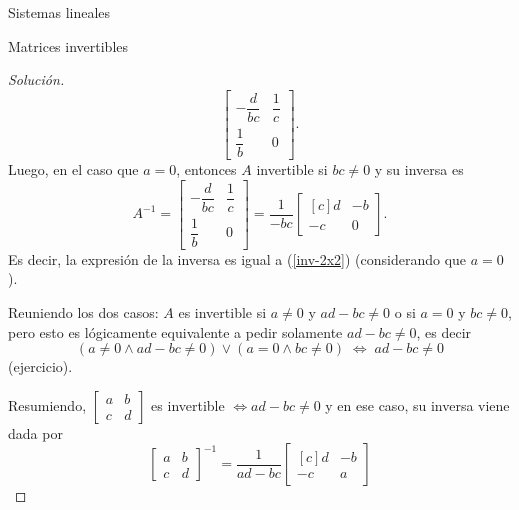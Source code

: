 \documentclass[a4paper,12pt,twoside,spanish,reqno]{amsbook}
\theoremstyle{definition}
\theoremstyle{remark}
\begin{document}
\begin{chapter}{Sistemas lineales}
\begin{section}{Matrices invertibles}
\begin{proof}[Solución]
\begin{equation*}
                \begin{bmatrix}-\dfrac{d}{bc}&\dfrac{1}{c}\\[6pt]\dfrac{1}{b}&0\end{bmatrix}.
                \end{equation*}  
                Luego, en el caso  que $a=0$, entonces $A$ invertible si  $b c\not=0$ y su inversa es
                \begin{equation*}
                A^{-1} = \begin{bmatrix}-\dfrac{d}{bc}&\dfrac{1}{c}\\[6pt]\dfrac{1}{b}&0\end{bmatrix} = 
                \dfrac{1}{-bc}
                \begin{bmatrix*}[c]d&-b\\-c&0\end{bmatrix*}.
                \end{equation*}
                Es decir, la expresión de la inversa es igual a (\ref{inv-2x2}) (considerando que  $a=0$).
                
                Reuniendo los dos casos:  $A$ es invertible si $a\not=0$ y  $ad-bc\not=0$ o si $a=0$ y $bc\not=0$, pero esto es lógicamente equivalente a pedir solamente  $ad-bc\not=0$, es decir
                \begin{equation*}
                (a\not=0 \wedge ad-bc\not=0) \vee (a=0 \wedge bc\not=0)\; \Leftrightarrow\; ad-bc\not=0
                \end{equation*}
                (ejercicio).
                
                Resumiendo, $\begin{bmatrix*} a&b\\c&d\end{bmatrix*}$ es invertible  $\Leftrightarrow ad-bc\not=0$  y en ese caso,  su inversa viene dada por 
                \begin{equation}
                \begin{bmatrix*} a&b\\c&d\end{bmatrix*}^{-1} =  \dfrac{1}{ad-bc}
                \begin{bmatrix*}[c]d&-b\\-c&a\end{bmatrix*}
                \end{equation} 
                
                \vskip 6pt
                

\end{proof}
\end{section}
\end{chapter}
\end{document}
